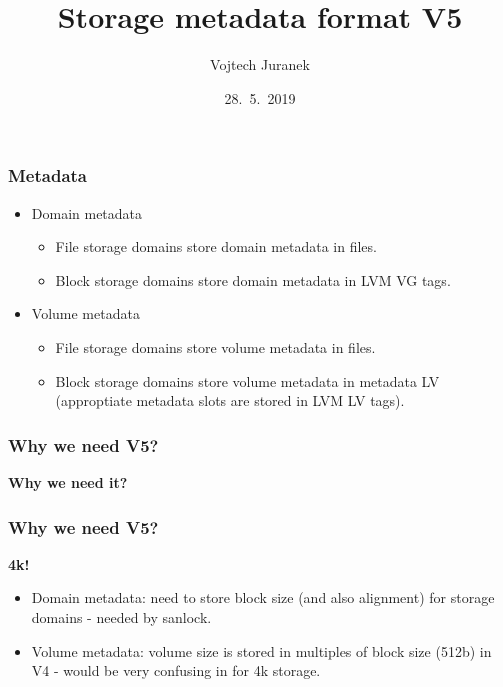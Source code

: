 \documentclass[10pt,utf8]{beamer}
\title{Storage metadata format V5}
\author{Vojtech Juranek}
\institute[Red Hat]{oVirt storage team}
\date{28.~5.~2019}
\begin{document}
\begin{frame}
	\titlepage
\end{frame}

\begin{frame}
	\frametitle{Metadata}
	\begin{itemize}
		\item Domain metadata
		\begin{itemize}
			\item File storage domains store domain metadata in files.
			\item Block storage domains store domain metadata in LVM VG tags.
		\end{itemize}

		\item Volume metadata
		\begin{itemize}
			\item File storage domains store volume metadata in files.
			\item Block storage domains store volume metadata in metadata LV (approptiate metadata slots are stored in LVM LV tags).
		\end{itemize}
	\end{itemize}
	
% 	
\end{frame}

\begin{frame}
	\frametitle{Why we need V5?}
	\centering
	\huge{\textbf{Why we need it?}}
\end{frame}

\begin{frame}
  \frametitle{Why we need V5?}
	\centering
	\huge{\textbf{4k!}}
	\normalsize
	\vspace{1cm}
	\begin{itemize}
		\item Domain metadata: need to store block size (and also alignment) for storage domains - needed by sanlock.
		\item Volume metadata: volume size is stored in multiples of block size (512b) in V4 - would be very confusing in for 4k storage.
	\end{itemize}
\end{frame}
\end{document}
